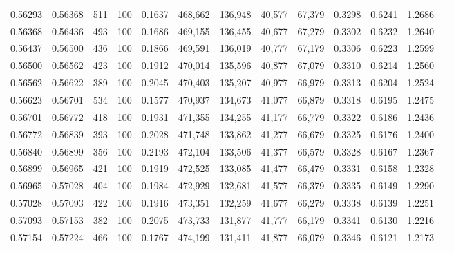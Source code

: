 \begin{tabular}{rrrrrrrrrrrrr}
0.56293 & 0.56368 &   511 & 100 &                                     0.1637 & 468,662 & 136,948 &  40,577 &  67,379 & 0.3298 & 0.6241 & 1.2686 \\
0.56368 & 0.56436 &   493 & 100 &                                     0.1686 & 469,155 & 136,455 &  40,677 &  67,279 & 0.3302 & 0.6232 & 1.2640 \\
0.56437 & 0.56500 &   436 & 100 &                                     0.1866 & 469,591 & 136,019 &  40,777 &  67,179 & 0.3306 & 0.6223 & 1.2599 \\
0.56500 & 0.56562 &   423 & 100 &                                     0.1912 & 470,014 & 135,596 &  40,877 &  67,079 & 0.3310 & 0.6214 & 1.2560 \\
0.56562 & 0.56622 &   389 & 100 &                                     0.2045 & 470,403 & 135,207 &  40,977 &  66,979 & 0.3313 & 0.6204 & 1.2524 \\
0.56623 & 0.56701 &   534 & 100 &                                     0.1577 & 470,937 & 134,673 &  41,077 &  66,879 & 0.3318 & 0.6195 & 1.2475 \\
0.56701 & 0.56772 &   418 & 100 &                                     0.1931 & 471,355 & 134,255 &  41,177 &  66,779 & 0.3322 & 0.6186 & 1.2436 \\
0.56772 & 0.56839 &   393 & 100 &                                     0.2028 & 471,748 & 133,862 &  41,277 &  66,679 & 0.3325 & 0.6176 & 1.2400 \\
0.56840 & 0.56899 &   356 & 100 &                                     0.2193 & 472,104 & 133,506 &  41,377 &  66,579 & 0.3328 & 0.6167 & 1.2367 \\
0.56899 & 0.56965 &   421 & 100 &                                     0.1919 & 472,525 & 133,085 &  41,477 &  66,479 & 0.3331 & 0.6158 & 1.2328 \\
0.56965 & 0.57028 &   404 & 100 &                                     0.1984 & 472,929 & 132,681 &  41,577 &  66,379 & 0.3335 & 0.6149 & 1.2290 \\
0.57028 & 0.57093 &   422 & 100 &                                     0.1916 & 473,351 & 132,259 &  41,677 &  66,279 & 0.3338 & 0.6139 & 1.2251 \\
0.57093 & 0.57153 &   382 & 100 &                                     0.2075 & 473,733 & 131,877 &  41,777 &  66,179 & 0.3341 & 0.6130 & 1.2216 \\
0.57154 & 0.57224 &   466 & 100 &                                     0.1767 & 474,199 & 131,411 &  41,877 &  66,079 & 0.3346 & 0.6121 & 1.2173 \\

\end{tabular}
